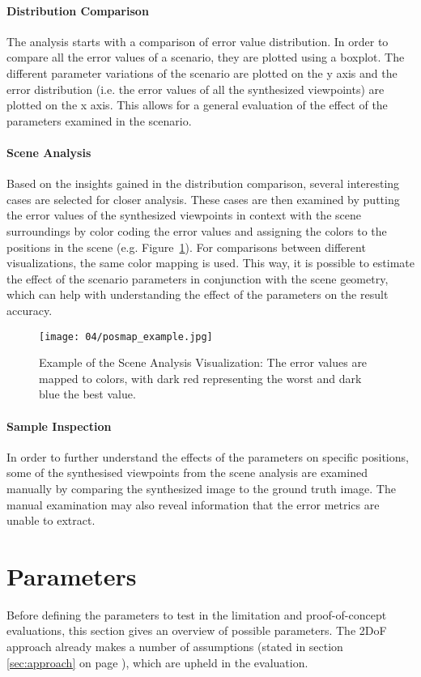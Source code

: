 \paragraph{Distribution Comparison}
The analysis starts with a comparison of error value distribution. In order to compare all the error values of a scenario, they are plotted using a boxplot. The different parameter variations of the scenario are plotted on the y axis and the error distribution (i.e. the error values of all the synthesized viewpoints) are plotted on the x axis. This allows for a general evaluation of the effect of the parameters examined in the scenario.

\paragraph{Scene Analysis}
Based on the insights gained in the distribution comparison, several interesting cases are selected for closer analysis. These cases are then examined by putting the error values of the synthesized viewpoints in context with the scene surroundings by color coding the error values and assigning the colors to the positions in the scene (e.g. Figure~\ref{fig:posmap_example}). For comparisons between different visualizations, the same color mapping is used. This way, it is possible to estimate the effect of the scenario parameters in conjunction with the scene geometry, which can help with understanding the effect of the parameters on the result accuracy.

\begin{figure}
		\centering
		\texttt{[image: 04/posmap\_example.jpg]}
		\caption{Example of the Scene Analysis Visualization: The error values are mapped to colors, with dark red representing the worst and dark blue the best value.}
		\label{fig:posmap_example}
\end{figure}

\paragraph{Sample Inspection}
In order to further understand the effects of the parameters on specific positions, some of the synthesised viewpoints from the scene analysis are examined manually by comparing the synthesized image to the ground truth image. The manual examination may also reveal information that the error metrics are unable to extract.

\section{Parameters}
Before defining the parameters to test in the limitation and proof-of-concept evaluations, this section gives an overview of possible parameters.
The 2DoF approach already makes a number of assumptions (stated in section \ref{sec:approach} on page \pageref{sec:approach}), which are upheld in the evaluation. 

